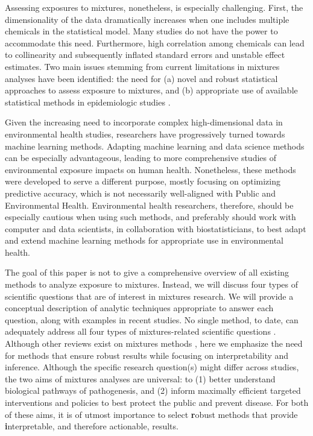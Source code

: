 Assessing exposures to mixtures, nonetheless, is especially challenging. First, the dimensionality of the data dramatically increases when one includes multiple chemicals in the statistical model. Many studies do not have the power to accommodate this need. Furthermore, high correlation among chemicals can lead to collinearity and subsequently inflated standard errors and unstable effect estimates. Two main issues stemming from current limitations in mixtures analyses have been identified: the need for (a) novel and robust statistical approaches to assess exposure to mixtures, and (b) appropriate use of available statistical methods in epidemiologic studies \citep{taylor16}.

Given the increasing need to incorporate complex high-dimensional data in environmental health studies, researchers have progressively turned towards machine learning methods. Adapting machine learning and data science methods can be especially advantageous, leading to more comprehensive studies of environmental exposure impacts on human health. Nonetheless, these methods were developed to serve a different purpose, mostly focusing on optimizing predictive accuracy, which is not necessarily well-aligned with Public and Environmental Health. Environmental health researchers, therefore, should be especially cautious when using such methods, and preferably should work with computer and data scientists, in collaboration with biostatisticians, to best adapt and extend machine learning methods for appropriate use in environmental health. 

The goal of this paper is not to give a comprehensive overview of all existing methods to analyze exposure to mixtures. Instead, we will discuss four types of scientific questions that are of interest in mixtures research. We will provide a conceptual description of analytic techniques appropriate to answer each question, along with examples in recent studies. No single method, to date, can adequately address all four types of mixtures-related scientific questions \citep{taylor16}. Although other reviews exist on mixtures methods \citep{hamra2018environmental, stafoggia2017statistical, huang2018cumulative, coker2018multi}, here we emphasize the need for methods that ensure robust results while focusing on interpretability and inference. Although the specific research question(s) might differ across studies, the two aims of mixtures analyses are universal: to (1) better understand biological pathways of pathogenesis, and (2) inform maximally efficient targeted interventions and policies to best protect the public and prevent disease. For both of these aims, it is of utmost importance to select {\textbf robust} methods that provide {\textbf interpretable}, and therefore actionable, results.

